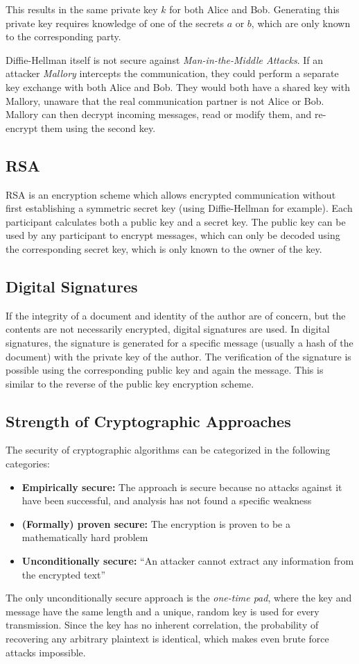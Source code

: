 This results in the same private key $k$ for both Alice and Bob. Generating this
private key requires knowledge of one of the secrets $a$ or $b$, which are only
known to the corresponding party.

Diffie-Hellman itself is not secure against \emph{Man-in-the-Middle Attacks}. If
an attacker \textit{Mallory} intercepts the communication, they could perform a
separate key exchange with both Alice and Bob. They would both have a shared key
with Mallory, unaware that the real communication partner is not Alice or Bob.
Mallory can then decrypt incoming messages, read or modify them, and re-encrypt
them using the second key.

\subsection{RSA}
RSA is an encryption scheme which allows encrypted communication without first
establishing a symmetric secret key (using Diffie-Hellman for example). Each
participant calculates both a public key and a secret key. The public key can be
used by any participant to encrypt messages, which can only be decoded using the
corresponding secret key, which is only known to the owner of the key.

\subsection{Digital Signatures}
If the integrity of a document and identity of the author are of concern, but
the contents are not necessarily encrypted, digital signatures are used. In
digital signatures, the signature is generated for a specific message (usually a
hash of the document) with the private key of the author. The verification of
the signature is possible using the corresponding public key and again the
message. This is similar to the reverse of the public key encryption scheme.

\subsection{Strength of Cryptographic Approaches}
The security of cryptographic algorithms can be categorized in the following
categories:

\begin{itemize}
    \item \textbf{Empirically secure:} The approach is secure because no attacks
    against it have been successful, and analysis has not found a specific
    weakness
    \item \textbf{(Formally) proven secure:} The encryption is proven to be a
    mathematically hard problem
    \item \textbf{Unconditionally secure:} ``An attacker cannot extract any
    information from the encrypted text''
\end{itemize}

The only unconditionally secure approach is the \emph{one-time pad}, where the
key and message have the same length and a unique, random key is used for every
transmission. Since the key has no inherent correlation, the probability of
recovering any arbitrary plaintext is identical, which makes even brute force
attacks impossible.

